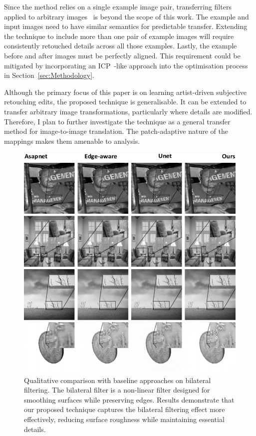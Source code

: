 Since the method relies on a single example image pair, transferring filters applied to arbitrary images~\cite{Yan14Automatic} is beyond the scope of this work. The example and input images need to have similar semantics for predictable transfer. Extending the technique to include more than one pair of example images will require consistently retouched details across all those examples. Lastly, the example before and after images must be perfectly aligned. This requirement could be mitigated by incorporating an ICP~\cite{Besl92AMethod}-like approach into the optimisation process in Section~\ref{sec:Methodology}. 

Although the primary focus of this paper is on learning artist-driven subjective retouching edits, the proposed technique is generalisable. It can be extended to transfer arbitrary image transformations, particularly where details are modified. Therefore, I plan to further investigate the technique as a general transfer method for image-to-image translation. The patch-adaptive nature of the mappings makes them amenable to analysis.

\begin{figure}%
  \centering
      \includegraphics[width=.82\linewidth]{Chapters/detail-retouching-figs/One-shot-labels.pdf}

  \includegraphics[width=\linewidth]{Chapters/detail-retouching-figs/Qualitative_zoomed_BF.pdf}
    \caption{Qualitative comparison with baseline approaches on bilateral filtering. The bilateral filter is a non-linear filter designed for smoothing surfaces while preserving edges. Results demonstrate that our proposed technique captures the bilateral filtering effect more effectively, reducing surface roughness while maintaining essential details.} 

   \label{fig:QualitativeComp_BF}%
\end{figure}

